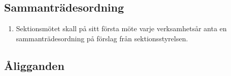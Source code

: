 \documentclass[11pt,a4paper]{article}
\begin{document}
\subsection{Sammanträdesordning}

\begin{enumerate}[\thesubsection .1]

  \item Sektionsmötet skall på sitt första möte varje verksamhetsår anta en sammanträdesordning på förslag från sektionsstyrelsen.

\end{enumerate}

\subsection{Åligganden}
\end{document}
